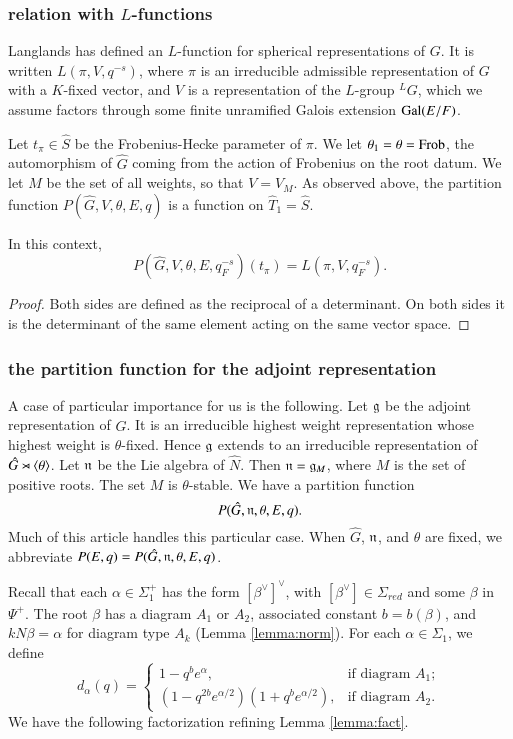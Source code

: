 \subsubsection{relation with $L$-functions}

Langlands has defined an $L$-function for spherical representations of
$G$.  It is written $L(\pi,V,q^{-s})$, where $\pi$ is an irreducible
admissible representation of $G$ with a $K$-fixed vector, and $V$ is a
representation of the $L$-group ${}^LG$, which we assume factors
through some finite unramified Galois extension ${\operatorname{Gal}}(E/F)$.

Let $t_\pi\in \hat S$ be the Frobenius-Hecke parameter of $\pi$.  We
let $\theta_1 = \theta = {\operatorname{Frob}}$, the automorphism of $\hat G$ coming
from the action of Frobenius on the root datum.  We let $M$ be the set
of all weights, so that $V = V_M$.  As observed above, the partition
function $P(\hat G,V,\theta,E,q)$ is a function on $\hat T_1 = \hat
S$.

\begin{lemma} In this context,
\[
P(\hat G,V,\theta,E,q_F^{-s})(t_\pi) = L(\pi,V,q_F^{-s}).
\]
\end{lemma}

\begin{proof} Both sides are defined as the reciprocal of a
  determinant.  On both sides it is the determinant of the same
  element acting on the same vector space.
\end{proof}

\subsubsection{the partition function for the adjoint representation}\label{sec:adjoint}

A case of particular importance for us is the following.  Let ${\mathfrak g}$ be
the adjoint representation of $\hat G$.  It is an irreducible highest
weight representation whose highest weight is $\theta$-fixed.  Hence
${\mathfrak g}$ extends to an irreducible representation of $\hat
G\rtimes\langle{\theta}\rangle$.  Let ${\mathfrak n}$ be the Lie algebra of $\hat N$.  Then
${\mathfrak n} = {\mathfrak g}_M$, where $M$ is the set of positive roots.  The set $M$ is
$\theta$-stable.  We have a partition function
\[
P(\hat G,{\mathfrak n},\theta,E,q).
\]
Much of this article handles this particular case.  When $\hat G$,
${\mathfrak n}$, and $\theta$ are fixed, we abbreviate $P(E,q) = P(\hat
G,{\mathfrak n},\theta,E,q)$.

Recall that each $\alpha\in \Sigma^+_1$ has the form
$[\beta^\vee]^\vee$, with $[\beta^\vee]\in \Sigma_{red}$ and some
$\beta$ in $\Psi^+$.  The root $\beta$ has a diagram $A_1$ or $A_2$,
associated constant $b=b(\beta)$, and $k N\beta = \alpha$ for diagram
type $A_k$ (Lemma \ref{lemma:norm}).  For each $\alpha\in \Sigma_1$,
we define
\begin{equation}\label{eqn:d}
d_\alpha(q) =
\begin{cases} {1-q^b e^\alpha},    &\text{if diagram } A_1;\\
{(1-q^{2b} e^{\alpha/2})(1+q^b e^{\alpha/2})},
&\text{if diagram } A_2.
\end{cases}
\end{equation}
We have the following factorization refining Lemma \ref{lemma:fact}.

